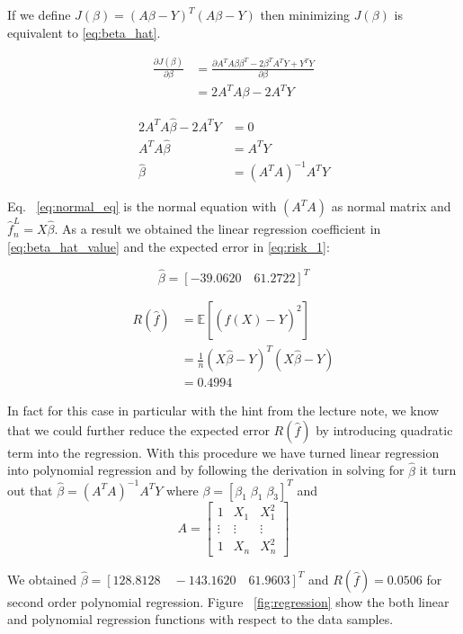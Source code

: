 \documentclass[a4paper]{article}
\begin{document}
	If we define $J(\beta) = (A\beta - Y)^T(A\beta - Y)$ then minimizing $J(\beta)$ is equivalent to \eqref{eq:beta_hat}.
	
	\begin{align}
		\frac{\partial J(\beta)}{\partial \beta} &= \frac{\partial A^TA\beta\beta^T - 2\beta^TA^TY + Y^TY}{\partial \beta} \\ 
			&= 2A^TA\beta - 2A^TY
	\end{align}
	
	\begin{align}
		2A^TA\hat{\beta} - 2A^TY &= 0 \\ 
		A^TA\hat{\beta} &= A^TY \\ 
		\hat{\beta} &= (A^TA)^{-1}A^TY \label{eq:normal_eq}
	\end{align}
	
	Eq. ~\eqref{eq:normal_eq} is the normal equation with $(A^TA)$ as normal matrix and $\hat{f}_n^L = X\hat{\beta}$. As a result we obtained the linear regression coefficient in \eqref{eq:beta_hat_value} and the expected error in \eqref{eq:risk_1}:
	
	\begin{equation} \label{eq:beta_hat_value}
		\hat{\beta} = [-39.0620 \quad 61.2722]^T
	\end{equation}
	
	\begin{align}
		R(\hat{f}) &= \mathbb{E}[(\hat{f}(X) - Y)^2] \\ 
			&= \frac{1}{n} (X\hat{\beta} - Y)^T(X\hat{\beta} - Y) \\
			&= 0.4994 \label{eq:risk_1}
	\end{align}
	
	In fact for this case in particular with the hint from the lecture note, we know that we could further reduce the expected error $R(\hat{f})$ by introducing quadratic term into the regression. With this procedure we have turned linear regression into polynomial regression and by following the derivation in solving for $\hat{\beta}$ it turn out that $\hat{\beta} = (A^TA)^{-1}A^TY$ where $\beta = [\beta_1\;\beta_1\;\beta_3]^T$ and 
	$$ A = \begin{bmatrix} 
				1 & X_1 & X_1^2 \\ 
				\vdots & \vdots & \vdots \\ 
				1 & X_n & X_n^2
			\end{bmatrix}$$
			
	We obtained $\hat{\beta} = [128.8128 \quad -143.1620 \quad 61.9603]^T$ and $R(\hat{f}) = 0.0506$ for second order polynomial regression. Figure ~\ref{fig:regression} show the both linear and polynomial regression functions with respect to the data samples.
	
\end{document}
